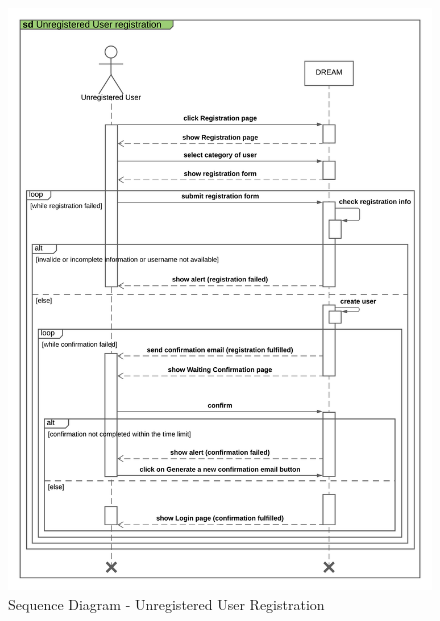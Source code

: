 \begin{center}
    \begin{figure}[H]
  \includegraphics[width=\textwidth,height=\textheight,keepaspectratio]{./Images/Sequence Diagram User Registration.png}
       \vspace*{-0.9cm}
  \caption{Sequence Diagram - Unregistered User Registration}
\end{figure}
\end{center}

